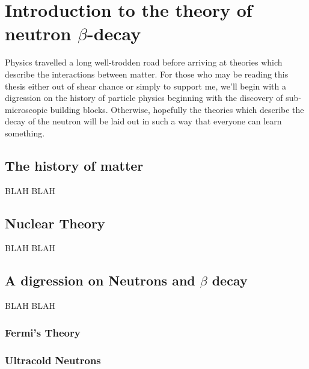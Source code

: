 \chapter{Introduction to the theory of neutron $\beta$-decay}
\label{ch:Introduction}

Physics travelled a long well-trodden road before arriving at theories which
describe the interactions between matter. For those who may be reading this thesis
either out of shear chance or simply to support me, we'll begin with a digression
on the history of particle physics beginning with the discovery of sub-microscopic
building blocks. Otherwise, hopefully the theories which describe the decay of the
neutron will be laid out in such a way that everyone can learn something. 


\section{The history of matter}
\label{sec:history_of_matter}

BLAH BLAH

\section{Nuclear Theory}
\label{sec:Ints}
BLAH BLAH


\section{A digression on Neutrons and $\beta$ decay}
\label{sec:Ints}
BLAH BLAH

\subsection{Fermi's Theory}

\subsection{Ultracold Neutrons}



